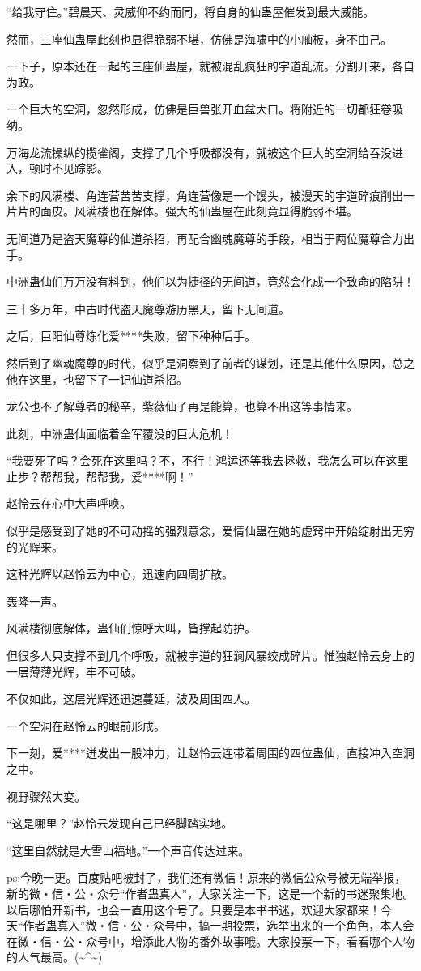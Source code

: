 \begin{this_body}
“给我守住。”碧晨天、灵威仰不约而同，将自身的仙蛊屋催发到最大威能。

然而，三座仙蛊屋此刻也显得脆弱不堪，仿佛是海啸中的小舢板，身不由己。

一下子，原本还在一起的三座仙蛊屋，就被混乱疯狂的宇道乱流。分割开来，各自为政。

一个巨大的空洞，忽然形成，仿佛是巨兽张开血盆大口。将附近的一切都狂卷吸纳。

万海龙流操纵的揽雀阁，支撑了几个呼吸都没有，就被这个巨大的空洞给吞没进入，顿时不见踪影。

余下的风满楼、角连营苦苦支撑，角连营像是一个馒头，被漫天的宇道碎痕削出一片片的面皮。风满楼也在解体。强大的仙蛊屋在此刻竟显得脆弱不堪。

无间道乃是盗天魔尊的仙道杀招，再配合幽魂魔尊的手段，相当于两位魔尊合力出手。

中洲蛊仙们万万没有料到，他们以为捷径的无间道，竟然会化成一个致命的陷阱！

三十多万年，中古时代盗天魔尊游历黑天，留下无间道。

之后，巨阳仙尊炼化爱****失败，留下种种后手。

然后到了幽魂魔尊的时代，似乎是洞察到了前者的谋划，还是其他什么原因，总之他在这里，也留下了一记仙道杀招。

龙公也不了解尊者的秘辛，紫薇仙子再是能算，也算不出这等事情来。

此刻，中洲蛊仙面临着全军覆没的巨大危机！

“我要死了吗？会死在这里吗？不，不行！鸿运还等我去拯救，我怎么可以在这里止步？帮帮我，帮帮我，爱****啊！”

赵怜云在心中大声呼唤。

似乎是感受到了她的不可动摇的强烈意念，爱情仙蛊在她的虚窍中开始绽射出无穷的光辉来。

这种光辉以赵怜云为中心，迅速向四周扩散。

轰隆一声。

风满楼彻底解体，蛊仙们惊呼大叫，皆撑起防护。

但很多人只支撑不到几个呼吸，就被宇道的狂澜风暴绞成碎片。惟独赵怜云身上的一层薄薄光辉，牢不可破。

不仅如此，这层光辉还迅速蔓延，波及周围四人。

一个空洞在赵怜云的眼前形成。

下一刻，爱****迸发出一股冲力，让赵怜云连带着周围的四位蛊仙，直接冲入空洞之中。

视野骤然大变。

“这是哪里？”赵怜云发现自己已经脚踏实地。

“这里自然就是大雪山福地。”一个声音传达过来。

ps:今晚一更。百度贴吧被封了，我们还有微信！原来的微信公众号被无端举报，新的微・信・公・众号“作者蛊真人”，大家关注一下，这是一个新的书迷聚集地。以后哪怕开新书，也会一直用这个号了。只要是本书书迷，欢迎大家都来！今天“作者蛊真人”微・信・公・众号中，搞一期投票，选举出来的一个角色，本人会在微・信・公・众号中，增添此人物的番外故事哦。大家投票一下，看看哪个人物的人气最高。(\~{}\^{}\~{})

\end{this_body}

